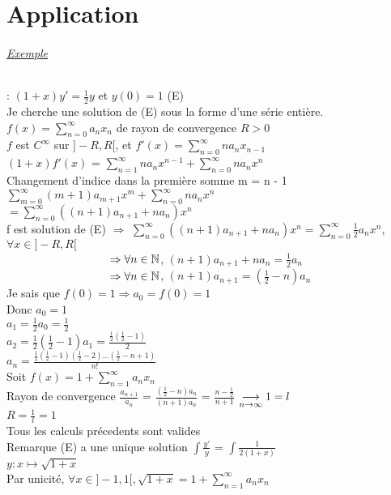 \documentclass{article}
\author{Frederic Becerril}
\newcommand\tab[1][1cm]{\hspace*{#1}}
\begin{document}
\part*{Application}

\paragraph{\underline{Exemple}}:
$(1+x)y' = \frac{1}{2}y$ et $y(0) = 1$ (E)\\
Je cherche une solution de (E) sous la forme d'une série entière.\\
$f(x) = \sum_{n=0}^{\infty} a_n x_n$ de rayon de convergence $R > 0$\\
$f$ est $C^{\infty}$ sur $]-R, R[$, et $f'(x) = \sum_{n=0}^{\infty} n a_n x_{n-1}$\\
$(1 + x)f'(x)$ = $\sum_{n=1}^{\infty} n a_n x^{n-1} + \sum_{n=0}^{\infty} n a_n x^n$\\
Changement d'indice dans la première somme m = n - 1\\
$\sum_{m=0}^{\infty} (m + 1) a_{m + 1} x^{m} + \sum_{n=0}^{\infty} n a_n x^n$\\
$= \sum_{n=0}^{\infty} ((n + 1)a_{n + 1} + na_n)x^n$\\
f est solution de (E) $\Rightarrow$ $\sum_{n=0}^{\infty} ((n + 1)a_{n + 1} + na_n)x^n = \sum_{n=0}^{\infty} \frac{1}{2}a_n x^n$, $\forall x \in ]-R, R[$ \vspace{2mm}\\
$\tab[3.2cm] \Rightarrow \forall n \in \mathbb{N}$, $(n +1)a_{n+1} + na_n = \frac{1}{2}a_n$\\
$\tab[3.2cm] \Rightarrow \forall n \in \mathbb{N}$, $(n +1)a_{n+1} = (\frac{1}{2} - n)a_n$\\
Je sais que $f(0) = 1 \Rightarrow a_0 = f(0) = 1$\\
Donc $a_0 = 1$\\
$a_1 = \frac{1}{2}a_0 = \frac{1}{2}$\\
$a_2 = \frac{1}{2}(\frac{1}{2} - 1)a_1 = \frac{\frac{1}{2}(\frac{1}{2} - 1)}{2}$\vspace{2mm}\\
$a_n = \frac{\frac{1}{2}(\frac{1}{2} - 1)(\frac{1}{2} - 2) \dots (\frac{1}{2} - n + 1)}{n!}$\\
Soit $f(x) = 1 + \sum_{n=1}^{\infty} a_n x_n$\\
Rayon de convergence $\frac{a_{n+1}}{a_n}$ = $\frac{(\frac{1}{2} - n)a_n}{(n+1)a_n}$ = $\frac{n - \frac{1}{2}}{n + 1}$ $\mylim 1 = l$\\
$R = \frac{1}{l} = 1$\\
Tous les calculs précedents sont valides\\
Remarque (E) a une unique solution $\int \frac{y'}{y}$ = $\int \frac{1}{2(1 + x)}$\\
\newpage
\noindent $y : x \longmapsto \sqrt{1 + x}$\\
Par unicité, $\forall x \in ]-1, 1[, \sqrt{1 + x} = 1 + \sum_{n=1}^{\infty} a_n x_n$
\end{document}
